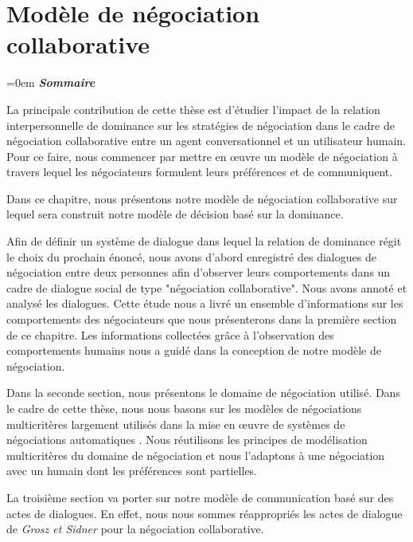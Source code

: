 	\chapter{Modèle de négociation collaborative}
\label{chap:chap3}
\begingroup
\parindent=0em
\emph{\textbf{Sommaire}}
\localtableofcontents 
\clearpage
\endgroup

La principale contribution de cette thèse est d'étudier l'impact de la relation interpersonnelle de dominance sur les stratégies de négociation dans le cadre de négociation collaborative entre un agent conversationnel et un utilisateur humain. 
Pour ce faire, nous commencer par mettre en œuvre un modèle de négociation à travers lequel les négociateurs formulent leurs préférences et de communiquent.


Dans ce chapitre, nous présentons notre modèle de négociation collaborative sur lequel sera construit notre modèle de décision basé sur la dominance. 

Afin de définir un système de dialogue dans lequel la relation de dominance régit le choix du prochain énoncé, nous avons d'abord enregistré des dialogues de négociation entre deux personnes afin d'observer leurs comportements dans un cadre de dialogue social de type "négociation collaborative". Nous avons annoté et analysé les dialogues. Cette étude nous a livré un ensemble d'informations sur les comportements des négociateurs que nous présenterons dans la première section de ce chapitre. 
Les informations collectées grâce à l'observation des comportements humains nous a guidé dans la conception de notre modèle de négociation.

Dans la seconde section, nous présentons le domaine de négociation utilisé. Dans le cadre de cette thèse, nous nous basons sur les modèles de négociations multicritères largement utilisés dans la mise en œuvre de systèmes de négociations automatiques \cite{jonker2007agent,lai2004literature,lai2008decentralized}. Nous réutilisons les principes de modélisation multicritères du domaine de négociation et nous l'adaptons à une négociation avec un humain dont les préférences sont partielles.  

La troisième section va porter sur notre modèle de communication basé sur des actes de dialogues. En effet, nous nous sommes réappropriés les actes de dialogue de \emph{Grosz et Sidner} \cite{grosz1986attention} pour la négociation collaborative.


